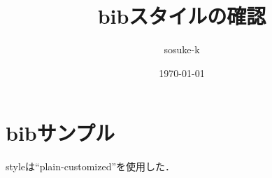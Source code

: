 \documentclass{article}
\title{bibスタイルの確認}
\author{sosuke-k}
\date{\today}
\begin{document}

\section*{bibサンプル}

styleは``plain-customized''を使用した\cite{sample:article,sample:inproceedings,sample:inbook}．





\end{document}
